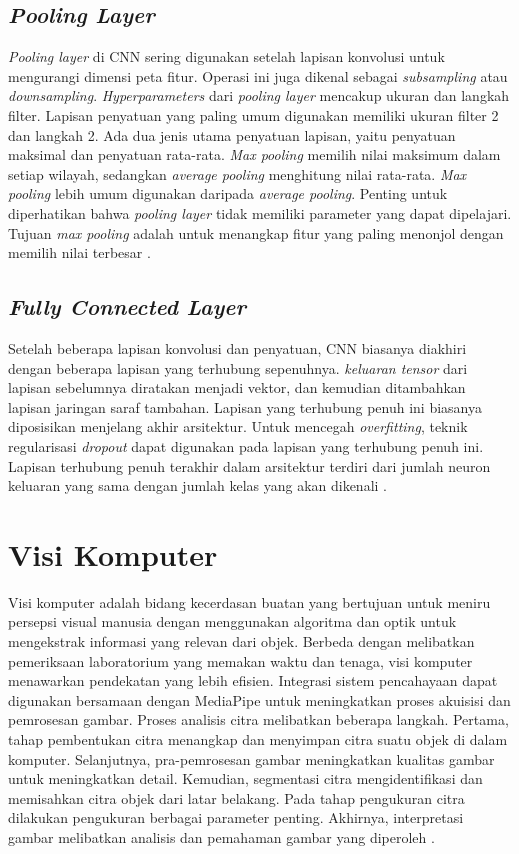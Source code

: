 \subsection{\emph{Pooling Layer}}
\label{subsec:cnn}

\emph{Pooling layer} di CNN sering digunakan setelah lapisan konvolusi untuk mengurangi dimensi peta fitur. Operasi ini juga dikenal sebagai \emph{subsampling} atau \emph{downsampling}. \emph{Hyperparameters} dari \emph{pooling layer} mencakup ukuran dan langkah filter. Lapisan penyatuan yang paling umum digunakan memiliki ukuran filter 2 dan langkah 2. Ada dua jenis utama penyatuan lapisan, yaitu penyatuan maksimal dan penyatuan rata-rata. \emph{Max pooling} memilih nilai maksimum dalam setiap wilayah, sedangkan \emph{average pooling} menghitung nilai rata-rata. \emph{Max pooling} lebih umum digunakan daripada \emph{average pooling}. Penting untuk diperhatikan bahwa \emph{pooling layer} tidak memiliki parameter yang dapat dipelajari. Tujuan \emph{max pooling} adalah untuk menangkap fitur yang paling menonjol dengan memilih nilai terbesar \parencite{Bezdan}.


\subsection{\emph{Fully Connected Layer}}
\label{subsec:cnn}

Setelah beberapa lapisan konvolusi dan penyatuan, CNN biasanya diakhiri dengan beberapa lapisan yang terhubung sepenuhnya. \emph{keluaran tensor} dari lapisan sebelumnya diratakan menjadi vektor, dan kemudian ditambahkan lapisan jaringan saraf tambahan. Lapisan yang terhubung penuh ini biasanya diposisikan menjelang akhir arsitektur. Untuk mencegah \emph{overfitting}, teknik regularisasi \emph{dropout} dapat digunakan pada lapisan yang terhubung penuh ini. Lapisan terhubung penuh terakhir dalam arsitektur terdiri dari jumlah neuron keluaran yang sama dengan jumlah kelas yang akan dikenali \parencite{Bezdan}.

\section{Visi Komputer}
\label{sec:deteksigesturtubuh}

Visi komputer adalah bidang kecerdasan buatan yang bertujuan untuk meniru persepsi visual manusia dengan menggunakan algoritma dan optik untuk mengekstrak informasi yang relevan dari objek. Berbeda dengan melibatkan pemeriksaan laboratorium yang memakan waktu dan tenaga, visi komputer menawarkan pendekatan yang lebih efisien. Integrasi sistem pencahayaan dapat digunakan bersamaan dengan MediaPipe untuk meningkatkan proses akuisisi dan pemrosesan gambar. Proses analisis citra melibatkan beberapa langkah. Pertama, tahap pembentukan citra menangkap dan menyimpan citra suatu objek di dalam komputer. Selanjutnya, pra-pemrosesan gambar meningkatkan kualitas gambar untuk meningkatkan detail. Kemudian, segmentasi citra mengidentifikasi dan memisahkan citra objek dari latar belakang. Pada tahap pengukuran citra dilakukan pengukuran berbagai parameter penting. Akhirnya, interpretasi gambar melibatkan analisis dan pemahaman gambar yang diperoleh \parencite{Kotappa}.


